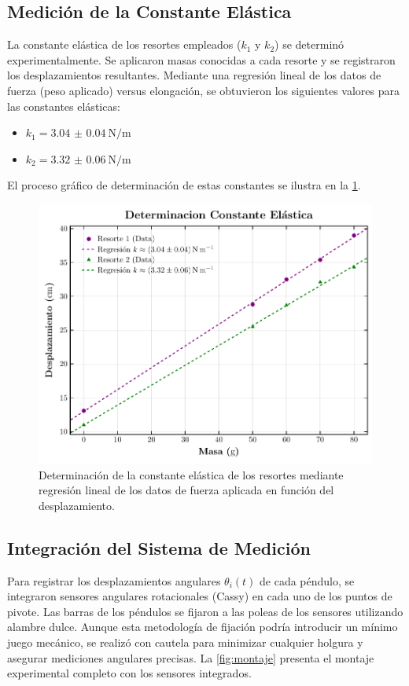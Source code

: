 \subsection{Medici\'on de la Constante El\'astica}

La constante el\'astica de los resortes empleados ($k_1$ y $k_2$) se
determin\'o experimentalmente. Se aplicaron masas conocidas a cada
resorte y se registraron los desplazamientos resultantes.
Mediante una regresi\'on lineal de los datos de fuerza
(peso aplicado) versus elongaci\'on, se obtuvieron los siguientes
valores para las constantes el\'asticas:
\begin{itemize}
  \item $k_1 = \qty{3.04(4)}{\N\per\m}$
  \item $k_2 = \qty{3.32(6)}{\N\per\m}$
\end{itemize}
El proceso gr\'afico de determinaci\'on de estas constantes se
ilustra en la \cref{fig:regresion}.

\begin{figure}[htbp!]
  \centering
  \includegraphics[width=0.75\linewidth]{Figures/springs-plot.pdf}
  \caption{Determinaci\'on de la constante el\'astica de los resortes
    mediante regresi\'on lineal de los datos de fuerza aplicada en
  funci\'on del desplazamiento.}
  \label{fig:regresion}
\end{figure}

\subsection{Integraci\'on del Sistema de Medici\'on}

Para registrar los desplazamientos angulares $\theta_i(t)$ de
cada p\'endulo, se integraron sensores angulares rotacionales
(Cassy) en cada uno de los puntos de pivote. Las barras de los
p\'endulos se fijaron a las poleas de los sensores utilizando
alambre dulce. Aunque esta metodolog\'ia de fijaci\'on podr\'ia
introducir un m\'inimo juego mec\'anico, se realiz\'o con cautela
para minimizar cualquier holgura y asegurar mediciones angulares
precisas. La \cref{fig:montaje} presenta el montaje experimental
completo con los sensores integrados.

